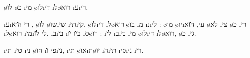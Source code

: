 \o{לו} \o{כ} \i{מי} \o{לו}\i{די} \i{ל}\o{רוא} \i{ע}\i{רי},

 \i{ע}\i{רי} \u{הוא}  ,  \o{לו} \o{שו}\i{שי} \i{תי}\i{קי},  \o{לו}\i{די} \i{ל}\o{רוא} \o{בו} \i{מ} \i{נ}\i{לי} : \o{מו}    \o{יו}\i{עי}, \u{הוא} \o{לא} \i{צי}  \o{כ}  \i{רי}  \i{ל}\o{רוא}  \i{מי}\i{לי} \u{לו}. \i{ב}\i{בי}  \i{ב}\u{יו} \u{יו} \i{ס}\o{רו} : \i{לי}    \i{ב}\i{בי} \i{מי} \o{לו}\i{די} \i{ל}\o{רוא}, \o{כ} \i{גי}.

\i{תי}  \i{טי} \i{ני} \o{חו}  \i{פי} \u{ו}\i{ני}, \i{תי}  \o{או}\i{ת}\o{יו} \i{ה}\i{תי} \i{סי}\i{ני} \i{רי}.

